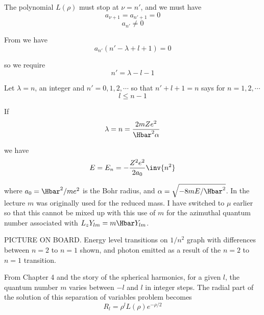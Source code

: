 The polynomial \(L(\rho)\) must stop at \(\nu = n'\), and we must have
%
\begin{equation}\label{eqn:PHY356FLecture10:260}
a_{\nu+1} = a_{n' +1} = 0
\end{equation}
\begin{equation}\label{eqn:PHY356FLecture10:270}
a_{n'} \ne 0
\end{equation}

From  we have
%
\begin{equation}\label{eqn:PHY356FLecture10:200a}
a_{n'} \left(
n' - \lambda + l + 1
\right)
=0
\end{equation}

so we require
\begin{equation}\label{eqn:PHY356FLecture10:280}
n' = \lambda - l - 1
\end{equation}

Let \(\lambda = n\), an integer and \(n' = 0, 1, 2, \cdots\) so that \(n' + l + 1 = n\) says for \(n= 1,2, \cdots\)
%
\begin{equation}\label{eqn:PHY356FLecture10:290}
l \le n-1
\end{equation}

If
%
\begin{equation}\label{eqn:PHY356FLecture10:300}
\lambda = n = \frac{2 m Z e^2 }{\Hbar^2 \alpha}
\end{equation}

we have
\begin{equation}\label{eqn:PHY356FLecture10:310}
E = E_n = - \frac{Z^2 e^2 }{2 a_0} \inv{n^2}
\end{equation}

where \(a_0 = \Hbar^2/m e^2\) is the Bohr radius, and \(\alpha = \sqrt{-8 m E/\Hbar^2}\).  In the lecture \(m\) was originally used for the reduced mass.  I have switched to \(\mu\) earlier so that this cannot be mixed up with this use of \(m\) for the azimuthal quantum number associated with \(L_z Y_{lm} = m \Hbar Y_{lm}\).

PICTURE ON BOARD.  Energy level transitions on \(1/n^2\) graph with differences between \(n=2\) to \(n=1\) shown, and photon emitted as a result of the \(n=2\) to \(n=1\) transition.

From Chapter 4 and the story of the spherical harmonics, for a given \(l\), the quantum number \(m\) varies between \(-l\) and \(l\) in integer steps.  The radial part of the solution of this separation of variables problem becomes
%
\begin{equation}\label{eqn:PHY356FLecture10:320}
R_l = \rho^l L(\rho) e^{-\rho/2}
\end{equation}

